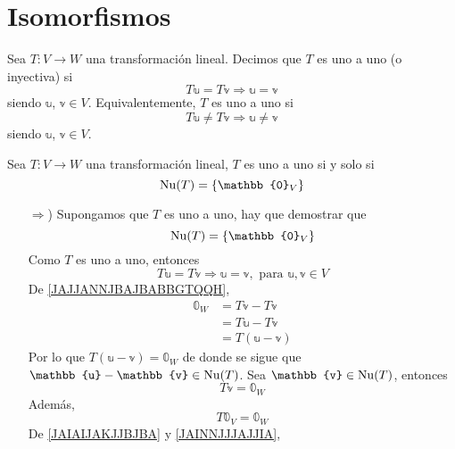 \newpage

\section{Isomorfismos}

\begin{definition}
    Sea $T:V \longrightarrow W$ una transformación lineal. Decimos que $T$ es uno a uno (o inyectiva) si
    $$T\mathbb{u} = T\mathbb{v} \Longrightarrow \mathbb{u} = \mathbb{v}$$
    siendo $\mathbb{u}$, $\mathbb{v} \in V$. Equivalentemente, $T$ es uno a uno si
    $$T\mathbb{u} \neq T\mathbb{v} \Longrightarrow \mathbb{u} \neq \mathbb{v}$$
    siendo $\mathbb{u}$, $\mathbb{v} \in V$.
\end{definition}

\begin{theorem}\label{theo:nu_cero}
    Sea $T:V \longrightarrow W$ una transformación lineal, $T$ es uno a uno si y solo si
    $$\Nuc(T) = \{ \mathbb{0}_V \}$$
    \demostracion
    \begin{enumerate}
        \item[$\bm{\Rightarrow}$)] Supongamos que $T$ es uno a uno, hay que demostrar que
        $$\Nuc(T) = \{ \mathbb{0}_V \}$$
        Como $T$ es uno a uno, entonces
        \begin{equation}
            T\mathbb{u} = T\mathbb{v} \Longrightarrow \mathbb{u} = \mathbb{v}, \text{ para } \mathbb{u},  \mathbb{v} \in V \label{JAJJANNJBAJBABBGTQQH}
        \end{equation}
        De \eqref{JAJJANNJBAJBABBGTQQH},
        \begin{align*}
            \mathbb{0}_W & = T\mathbb{v} - T\mathbb{v} \\
            & = T\mathbb{u} - T\mathbb{v} \\
            & = T(\mathbb{u} - \mathbb{v})
        \end{align*}
        Por lo que $T(\mathbb{u} - \mathbb{v}) = \mathbb{0}_W$ de donde se sigue que $\mathbb{u} - \mathbb{v} \in \Nuc(T)$. Sea $\mathbb{v} \in \Nuc(T)$, entonces
        \begin{equation}
            T\mathbb{v} = \mathbb{0}_W \label{JAIAIJAKJJBJBA}
        \end{equation}
        Además,
        \begin{equation}
            T\mathbb{0}_V = \mathbb{0}_W \label{JAINNJJJAJJIA}
        \end{equation}
        De \eqref{JAIAIJAKJJBJBA} y \eqref{JAINNJJJAJJIA},

\end{enumerate}
\end{theorem}
